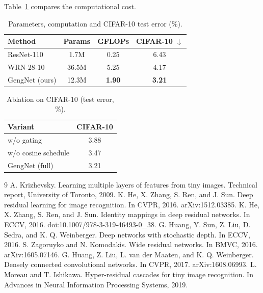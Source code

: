 \documentclass{article}
\begin{document}
Table~\ref{tab:cost} compares the computational cost.

\begin{table}[t]
\centering
\caption{Parameters, computation and CIFAR-10 test error (\%).}
\label{tab:cost}
\begin{tabular}{lccc}
\toprule
Method & Params & GFLOPs & CIFAR-10 $\downarrow$ \\
\midrule
ResNet-110~\cite{he2016deep} & 1.7M & 0.25 & 6.43 \\
WRN-28-10~\cite{zagoruyko2016wide} & 36.5M & 5.25 & 4.17 \\
GengNet (ours) & 12.3M & \textbf{1.90} & \textbf{3.21} \\
\bottomrule
\end{tabular}
\end{table}

\begin{table}[t]
\centering
\caption{Ablation on CIFAR-10 (test error, \%).}
\label{tab:ablation}
\begin{tabular}{lc}
\toprule
Variant & CIFAR-10 \\
\midrule
w/o gating & 3.88 \\
w/o cosine schedule & 3.47 \\
GengNet (full) & 3.21 \\
\bottomrule
\end{tabular}
\end{table}

\begin{thebibliography}{9}
 A. Krizhevsky. Learning multiple layers of features from tiny images.
Technical report, University of Toronto, 2009.
 K. He, X. Zhang, S. Ren, and J. Sun. Deep residual learning for image recognition.
In CVPR, 2016. arXiv:1512.03385.
 K. He, X. Zhang, S. Ren, and J. Sun. Identity mappings in deep residual networks.
In ECCV, 2016. doi:10.1007/978-3-319-46493-0\_38.
 G. Huang, Y. Sun, Z. Liu, D. Sedra, and K. Q. Weinberger. Deep networks with stochastic depth.
In ECCV, 2016.
 S. Zagoruyko and N. Komodakis. Wide residual networks. In BMVC, 2016. arXiv:1605.07146.
 G. Huang, Z. Liu, L. van der Maaten, and K. Q. Weinberger. Densely connected convolutional networks.
In CVPR, 2017. arXiv:1608.06993.
 L. Moreau and T. Ishikawa. Hyper-residual cascades for tiny image recognition.
In Advances in Neural Information Processing Systems, 2019.
\end{thebibliography}
\end{document}
